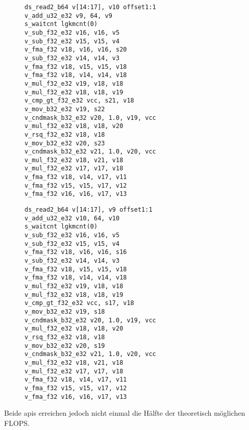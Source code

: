 \begin{figure}
    \begin{minipage}{0.5\textwidth}
        \centering
        \begin{verbatim}
ds_read2_b64 v[14:17], v10 offset1:1
v_add_u32_e32 v9, 64, v9
s_waitcnt lgkmcnt(0)
v_sub_f32_e32 v16, v16, v5
v_sub_f32_e32 v15, v15, v4
v_fma_f32 v18, v16, v16, s20
v_sub_f32_e32 v14, v14, v3
v_fma_f32 v18, v15, v15, v18
v_fma_f32 v18, v14, v14, v18
v_mul_f32_e32 v19, v18, v18
v_mul_f32_e32 v18, v18, v19
v_cmp_gt_f32_e32 vcc, s21, v18
v_mov_b32_e32 v19, s22
v_cndmask_b32_e32 v20, 1.0, v19, vcc
v_mul_f32_e32 v18, v18, v20
v_rsq_f32_e32 v18, v18
v_mov_b32_e32 v20, s23
v_cndmask_b32_e32 v21, 1.0, v20, vcc
v_mul_f32_e32 v18, v21, v18
v_mul_f32_e32 v17, v17, v18
v_fma_f32 v18, v14, v17, v11
v_fma_f32 v15, v15, v17, v12
v_fma_f32 v16, v16, v17, v13                   
        \end{verbatim}
        \label{amd:nbody:isahc}
    \end{minipage}
    \begin{minipage}{0.5\textwidth}
        \centering
        \begin{verbatim}
ds_read2_b64 v[14:17], v9 offset1:1
v_add_u32_e32 v10, 64, v10
s_waitcnt lgkmcnt(0)
v_sub_f32_e32 v16, v16, v5
v_sub_f32_e32 v15, v15, v4
v_fma_f32 v18, v16, v16, s16
v_sub_f32_e32 v14, v14, v3
v_fma_f32 v18, v15, v15, v18
v_fma_f32 v18, v14, v14, v18
v_mul_f32_e32 v19, v18, v18
v_mul_f32_e32 v18, v18, v19
v_cmp_gt_f32_e32 vcc, s17, v18
v_mov_b32_e32 v19, s18
v_cndmask_b32_e32 v20, 1.0, v19, vcc
v_mul_f32_e32 v18, v18, v20
v_rsq_f32_e32 v18, v18
v_mov_b32_e32 v20, s19
v_cndmask_b32_e32 v21, 1.0, v20, vcc
v_mul_f32_e32 v18, v21, v18
v_mul_f32_e32 v17, v17, v18
v_fma_f32 v18, v14, v17, v11
v_fma_f32 v15, v15, v17, v12
v_fma_f32 v16, v16, v17, v13
        \end{verbatim}
        \label{amd:nbody:isahip}
    \end{minipage}
\end{figure}

Beide \gls{api}s erreichen jedoch nicht einmal die Hälfte der theoretisch
möglichen FLOPS.
